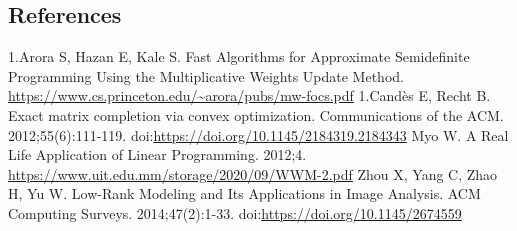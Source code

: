 \documentclass{article}
\begin{document}
\newpage
\subsection{References}
\begin{thebibliography}{12}
\bibitem{} 1.Arora S, Hazan E, Kale S. Fast Algorithms for Approximate Semidefinite Programming Using the Multiplicative Weights Update Method. \url{https://www.cs.princeton.edu/~arora/pubs/mw-focs.pdf}
\bibitem{} 1.Candès E, Recht B. Exact matrix completion via convex optimization. Communications of the ACM. 2012;55(6):111-119. doi:\url{https://doi.org/10.1145/2184319.2184343}
\bibitem{} Myo W. A Real Life Application of Linear Programming. 2012;4. \url{https://www.uit.edu.mm/storage/2020/09/WWM-2.pdf}
\bibitem{} Zhou X, Yang C, Zhao H, Yu W. Low-Rank Modeling and Its Applications in Image Analysis. ACM Computing Surveys. 2014;47(2):1-33. doi:\url{https://doi.org/10.1145/2674559}
‌
\end{thebibliography}
\end{document}
